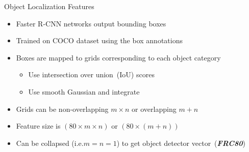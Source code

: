 \documentclass{beamer}
\begin{document}
\begin{frame}{Object Localization Features}
    \begin{itemize}
        \item Faster R-CNN networks output bounding boxes 
        \item Trained on COCO dataset using the box annotations 
        \item Boxes are mapped to grids corresponding to each object category 
           \begin{itemize}
               \item Use intersection over union~(IoU) scores
               \item Use smooth Gaussian and integrate 
           \end{itemize}
        \item Grids can be non-overlapping $m\times n$ or overlapping $m+n$
        \item Feature size is $(80\times m\times n)$ or  $(80\times (m+n))$
        \item Can be collapsed (i.e.\@ $m=n=1$) to get object detector vector~(\textbf{\emph{FRC80}}) 
    \end{itemize}
\end{frame}
\end{document}
